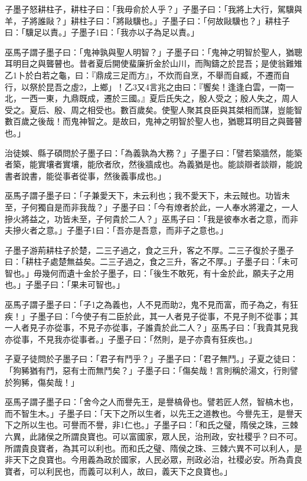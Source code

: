 
\begin{pinyinscope}
子墨子怒耕柱子，耕柱子曰：「我毋俞於人乎？」子墨子曰：「我將上大行，駕驥與羊，子將誰敺？」耕柱子曰：「將敺驥也。」子墨子曰：「何故敺驥也？」耕柱子曰：「驥足以責。」子墨子1曰：「我亦以子為足以責。」

巫馬子謂子墨子曰：「鬼神孰與聖人明智？」子墨子曰：「鬼神之明智於聖人，猶聰耳明目之與聾瞽也。昔者夏后開使蜚廉折金於山川，而陶鑄之於昆吾；是使翁難雉乙1卜於白若之龜，曰：『鼎成三足而方』，不炊而自烹，不舉而自臧，不遷而自行，以祭於昆吾之虛2，上鄉」！乙3又4言兆之由曰：『饗矣！逢逢白雲，一南一北，一西一東，九鼎既成，遷於三國。』夏后氏失之，殷人受之；殷人失之，周人受之。夏后、殷、周之相受也。數百歲矣。使聖人聚其良臣與其桀相而謀，豈能智數百歲之後哉！而鬼神智之。是故曰，鬼神之明智於聖人也，猶聰耳明目之與聾瞽也。」

治徒娛、縣子碩問於子墨子曰：「為義孰為大務？」子墨子曰：「譬若築牆然，能築者築，能實壤者實壤，能欣者欣，然後牆成也。為義猶是也。能談辯者談辯，能說書者說書，能從事者從事，然後義事成也。」

巫馬子謂子墨子曰：「子兼愛天下，未云利也；我不愛天下，未云賊也。功皆未至，子何獨自是而非我哉？」子墨子曰：「今有燎者於此，一人奉水將灌之，一人摻火將益之，功皆未至，子何貴於二人？」巫馬子曰：「我是彼奉水者之意，而非夫摻火者之意。」子墨子1曰：「吾亦是吾意，而非子之意也。」

子墨子游荊耕柱子於楚，二三子過之，食之三升，客之不厚。二三子復於子墨子曰：「耕柱子處楚無益矣。二三子過之，食之三升，客之不厚。」子墨子曰：「未可智也。」毋幾何而遺十金於子墨子，曰：「後生不敢死，有十金於此，願夫子之用也。」子墨子曰：「果未可智也。」

巫馬子謂子墨子曰：「子1之為義也，人不見而助2，鬼不見而富，而子為之，有狂疾！」子墨子曰：「今使子有二臣於此，其一人者見子從事，不見子則不從事；其一人者見子亦從事，不見子亦從事，子誰貴於此二人？」巫馬子曰：「我貴其見我亦從事，不見我亦從事者。」子墨子曰：「然則，是子亦貴有狂疾也。」

子夏子徒問於子墨子曰：「君子有鬥乎？」子墨子曰：「君子無鬥。」子夏之徒曰：「狗豨猶有鬥，惡有士而無鬥矣？」子墨子曰：「傷矣哉！言則稱於湯文，行則譬於狗豨，傷矣哉！」

巫馬子謂子墨子曰：「舍今之人而譽先王，是譽槁骨也。譬若匠人然，智槁木也，而不智生木。」子墨子曰：「天下之所以生者，以先王之道教也。今譽先王，是譽天下之所以生也。可譽而不譽，非1仁也。」子墨子曰：「和氏之璧，隋侯之珠，三棘六異，此諸侯之所謂良寶也。可以富國家，眾人民，治刑政，安社稷乎？曰不可。所謂貴良寶者，為其可以利也。而和氏之璧、隋侯之珠、三棘六異不可以利人，是非天下之良寶也。今用義為政於國家，人民必眾，刑政必治，社稷必安。所為貴良寶者，可以利民也，而義可以利人，故曰，義天下之良寶也。」


\end{pinyinscope}

